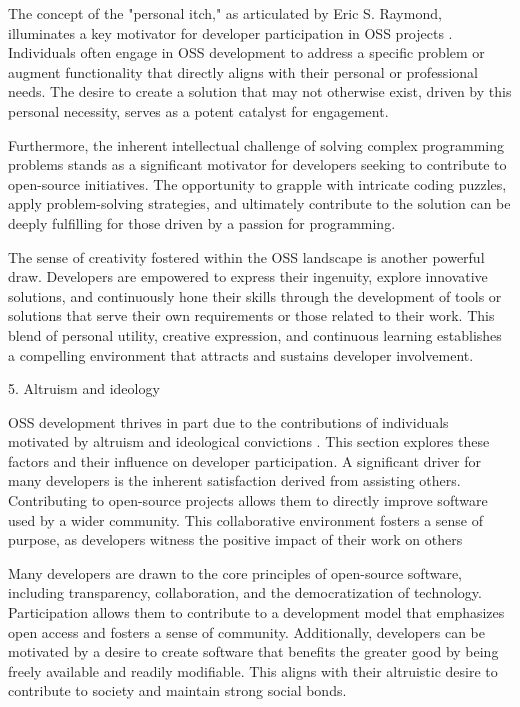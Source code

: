 The concept of the "personal itch," as articulated by Eric S. Raymond, illuminates a key motivator for developer participation in OSS projects \cite{holtgrewe2004articulating}. Individuals often engage in OSS development to address a specific problem or augment functionality that directly aligns with their personal or professional needs. The desire to create a solution that may not otherwise exist, driven by this personal necessity, serves as a potent catalyst for engagement.

Furthermore, the inherent intellectual challenge of solving complex programming problems stands as a significant motivator for developers seeking to contribute to open-source initiatives. The opportunity to grapple with intricate coding puzzles, apply problem-solving strategies, and ultimately contribute to the solution can be deeply fulfilling for those driven by a passion for programming.

The sense of creativity fostered within the OSS landscape is another powerful draw. Developers are empowered to express their ingenuity, explore innovative solutions, and continuously hone their skills through the development of tools or solutions that serve their own requirements or those related to their work. This blend of personal utility, creative expression, and continuous learning establishes a compelling environment that attracts and sustains developer involvement.

5. Altruism and ideology

OSS development thrives in part due to the contributions of individuals motivated by altruism and ideological convictions \cite{07zhao2024openrank,08zhang2024paid,10wu2007empirical,11gerosa2021shifting,13li2012leadership,16ke2008motivations,17alexander2002working,18oreg2008exploring}. This section explores these factors and their influence on developer participation. A significant driver for many developers is the inherent satisfaction derived from assisting others. Contributing to open-source projects allows them to directly improve software used by a wider community. This collaborative environment fosters a sense of purpose, as developers witness the positive impact of their work on others

Many developers are drawn to  the core principles of open-source software, including transparency, collaboration, and the democratization of technology. Participation allows them to contribute to a development model that emphasizes open access and fosters a sense of community.  Additionally, developers can be motivated by a desire to create software that benefits the greater good by being freely available and readily modifiable. This aligns with their altruistic desire to contribute to society and maintain strong social bonds.

